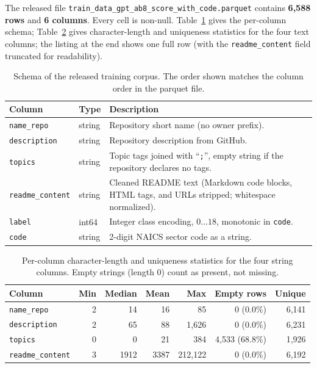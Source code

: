 The released file \texttt{train\_data\_gpt\_ab8\_score\_with\_code.parquet} contains \textbf{6,588 rows} and \textbf{6 columns}. Every cell is non-null. Table~\ref{tab:schema-fields} gives the per-column schema; Table~\ref{tab:schema-stats} gives character-length and uniqueness statistics for the four text columns; the listing at the end shows one full row (with the \texttt{readme\_content} field truncated for readability).

\begin{table}[ht]
\centering
\caption{Schema of the released training corpus. The order shown matches the column order in the parquet file.}
\label{tab:schema-fields}
\small
\begin{tabular}{lll}
\toprule
Column & Type & Description \\
\midrule
\texttt{name\_repo} & string & Repository short name (no owner prefix). \\
\texttt{description} & string & Repository description from GitHub. \\
\texttt{topics} & string & Topic tags joined with ``\texttt{;\space}'', empty string if the repository declares no tags. \\
\texttt{readme\_content} & string & Cleaned README text (Markdown code blocks, HTML tags, and URLs stripped; whitespace normalized). \\
\texttt{label} & int64 & Integer class encoding, $0\ldots 18$, monotonic in \texttt{code}. \\
\texttt{code} & string & 2-digit NAICS sector code as a string. \\
\bottomrule
\end{tabular}
\end{table}

\begin{table}[ht]
\centering
\caption{Per-column character-length and uniqueness statistics for the four string columns. Empty strings (length 0) count as present, not missing.}
\label{tab:schema-stats}
\small
\begin{tabular}{lrrrrrr}
\toprule
Column & Min & Median & Mean & Max & Empty rows & Unique \\
\midrule
\texttt{name\_repo} & 2 & 14 & 16 & 85 & 0 (0.0\%) & 6,141 \\
\texttt{description} & 2 & 65 & 88 & 1,626 & 0 (0.0\%) & 6,231 \\
\texttt{topics} & 0 & 0 & 21 & 384 & 4,533 (68.8\%) & 1,926 \\
\texttt{readme\_content} & 3 & 1912 & 3387 & 212,122 & 0 (0.0\%) & 6,192 \\
\bottomrule
\end{tabular}
\end{table}

